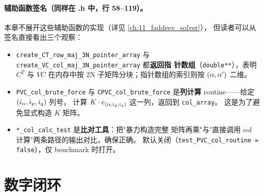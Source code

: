\paragraph{辅助函数签名（同样在 .h 中，行 58--119）。}
本章不展开这些辅助函数的实现（详见 \cref{ch:11_faddeev_solver}），
但读者可以从签名直接看出三个观察：
\begin{itemize}
  \item \texttt{create\_CT\_row\_maj\_3N\_pointer\_array} 与
        \texttt{create\_VC\_col\_maj\_3N\_pointer\_array} 都\textbf{返回指
        针数组}（\texttt{double**}），表明 \(C^T\) 与 \(VC\) 在内存中按
        2N 子矩阵分块；指针数组的索引则按 \((\alpha, \alpha')\) 二维。
  \item \texttt{PVC\_col\_brute\_force} 与 \texttt{CPVC\_col\_brute\_force}
        是\textbf{列计算} routine——给定 \((i_\alpha, i_p, i_q)\) 列号，
        计算 \(K \cdot e_{(\alpha, i_p, i_q)}\) 这一列，返回到 \texttt{col\_array}。
        这是为了避免显式构造 \(K\) 矩阵。
  \item \texttt{*\_col\_calc\_test} 是\textbf{比对工具}：把"暴力构造完整
        矩阵再乘"与"直接调用 col 计算"两条路径的输出对比，确保正确。
        默认关闭（\texttt{test\_PVC\_col\_routine = false}），仅 benchmark 时打开。
\end{itemize}

\section{数字闭环}
\label{sec:ch04-numerics}


